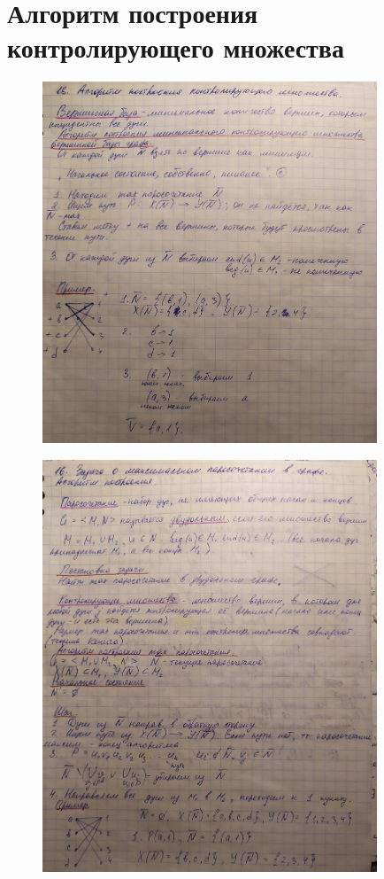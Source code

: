 \documentclass[discrete.tex]{subfiles}
\begin{document}
  \section{Алгоритм построения контролирующего множества}

  \begin{figure}[H]
          \includegraphics[width=10cm]{pics/51_1}
          \centering
  \end{figure}

  \begin{figure}[H]
          \includegraphics[width=10cm]{pics/51_2}
          \centering
  \end{figure}
\end{document}
